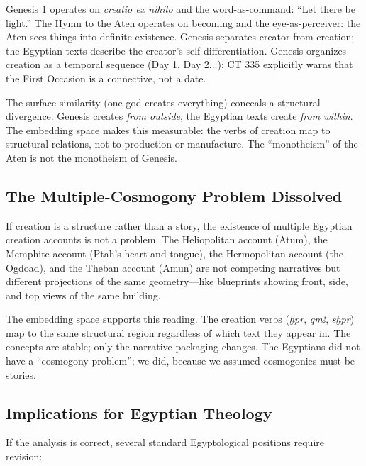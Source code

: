 \documentclass[11pt, a4paper]{article}
\begin{document}
Genesis 1 operates on \textit{creatio ex nihilo} and the word-as-command: ``Let there be light.'' The Hymn to the Aten operates on becoming and the eye-as-perceiver: the Aten sees things into definite existence. Genesis separates creator from creation; the Egyptian texts describe the creator's self-differentiation. Genesis organizes creation as a temporal sequence (Day 1, Day 2...); CT 335 explicitly warns that the First Occasion is a connective, not a date.

The surface similarity (one god creates everything) conceals a structural divergence: Genesis creates \textit{from outside}, the Egyptian texts create \textit{from within}. The embedding space makes this measurable: the verbs of creation map to structural relations, not to production or manufacture. The ``monotheism'' of the Aten is not the monotheism of Genesis.

\subsection{The Multiple-Cosmogony Problem Dissolved}

If creation is a structure rather than a story, the existence of multiple Egyptian creation accounts is not a problem. The Heliopolitan account (Atum), the Memphite account (Ptah's heart and tongue), the Hermopolitan account (the Ogdoad), and the Theban account (Amun) are not competing narratives but different projections of the same geometry---like blueprints showing front, side, and top views of the same building.

The embedding space supports this reading. The creation verbs (\textit{ḫpr}, \textit{qmꜣ}, \textit{sḫpr}) map to the same structural region regardless of which text they appear in. The concepts are stable; only the narrative packaging changes. The Egyptians did not have a ``cosmogony problem''; we did, because we assumed cosmogonies must be stories.

\subsection{Implications for Egyptian Theology}

If the analysis is correct, several standard Egyptological positions require revision:
\end{document}
